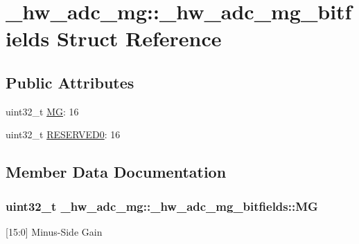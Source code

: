 \hypertarget{struct__hw__adc__mg_1_1__hw__adc__mg__bitfields}{}\section{\+\_\+hw\+\_\+adc\+\_\+mg\+:\+:\+\_\+hw\+\_\+adc\+\_\+mg\+\_\+bitfields Struct Reference}
\label{struct__hw__adc__mg_1_1__hw__adc__mg__bitfields}
\subsection*{Public Attributes}
\begin{DoxyCompactItemize}
\item 
uint32\+\_\+t \hyperlink{struct__hw__adc__mg_1_1__hw__adc__mg__bitfields_afda0091ac017403ae24abde09d7ea50a}{MG}\+: 16
\item 
uint32\+\_\+t \hyperlink{struct__hw__adc__mg_1_1__hw__adc__mg__bitfields_a52ed7fff224bb09a9d9b17a04bb0e997}{R\+E\+S\+E\+R\+V\+E\+D0}\+: 16
\end{DoxyCompactItemize}


\subsection{Member Data Documentation}
\subsubsection[{\texorpdfstring{MG}{MG}}]{\setlength{\rightskip}{0pt plus 5cm}uint32\+\_\+t \+\_\+hw\+\_\+adc\+\_\+mg\+::\+\_\+hw\+\_\+adc\+\_\+mg\+\_\+bitfields\+::\+MG}\hypertarget{struct__hw__adc__mg_1_1__hw__adc__mg__bitfields_afda0091ac017403ae24abde09d7ea50a}{}\label{struct__hw__adc__mg_1_1__hw__adc__mg__bitfields_afda0091ac017403ae24abde09d7ea50a}
\mbox{[}15\+:0\mbox{]} Minus-\/\+Side Gain 
